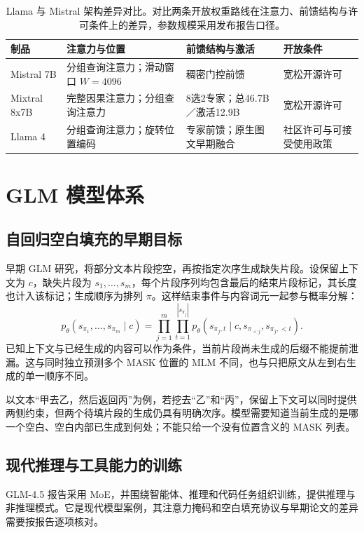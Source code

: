 \documentclass[../textbook.tex]{subfiles}
\begin{document}
\begin{table}[htbp]
\centering
\small
\caption[Llama 与 Mistral 架构差异对比]{Llama 与 Mistral 架构差异对比。对比两条开放权重路线在注意力、前馈结构与许可条件上的差异，参数规模采用发布报告口径。}\label{tab:open-llama-mistral}
\begin{tabularx}{\linewidth}{p{22mm}XXX}
\toprule 制品 & 注意力与位置 & 前馈结构与激活 & 开放条件\\\midrule
Mistral 7B & 分组查询注意力；滑动窗口 $W=4096$ & 稠密门控前馈 & 宽松开源许可\\
Mixtral 8x7B & 完整因果注意力；分组查询注意力 & 8选2专家；总46.7B／激活12.9B & 宽松开源许可\\
Llama 4 & 分组查询注意力；旋转位置编码 & 专家前馈；原生图文早期融合 & 社区许可与可接受使用政策\\
\bottomrule
\end{tabularx}
\end{table}

\section{GLM 模型体系}

\subsection{自回归空白填充的早期目标}
早期 GLM 研究，将部分文本片段挖空，再按指定次序生成缺失片段\cite{du2021glm}。设保留上下文为 $c$，缺失片段为 $s_1,\ldots,s_m$，每个片段序列均包含最后的结束片段标记，其长度也计入该标记；生成顺序为排列 $\pi$。这样结束事件与内容词元一起参与概率分解：
\begin{equation}
 p_\theta(s_{\pi_1},\ldots,s_{\pi_m}\mid c)
 =\prod_{j=1}^{m}\prod_{t=1}^{|s_{\pi_j}|}
 p_\theta(s_{\pi_j,t}\mid c,s_{\pi_{<j}},s_{\pi_j,<t}).
\end{equation}
已知上下文与已经生成的内容可以作为条件，当前片段尚未生成的后缀不能提前泄漏。这与同时独立预测多个 MASK 位置的 MLM 不同，也与只把原文从左到右生成的单一顺序不同。

以文本“甲去乙，然后返回丙”为例，若挖去“乙”和“丙”，保留上下文可以同时提供两侧约束，但两个待填片段的生成仍具有明确次序。模型需要知道当前生成的是哪一个空白、空白内部已生成到何处；不能只给一个没有位置含义的 MASK 列表。

\subsection{现代推理与工具能力的训练}
GLM-4.5 报告采用 MoE，并围绕智能体、推理和代码任务组织训练，提供推理与非推理模式\cite{glm2025glm45}。它是现代模型案例，其注意力掩码和空白填充协议与早期论文的差异需要按报告逐项核对。
\end{document}

